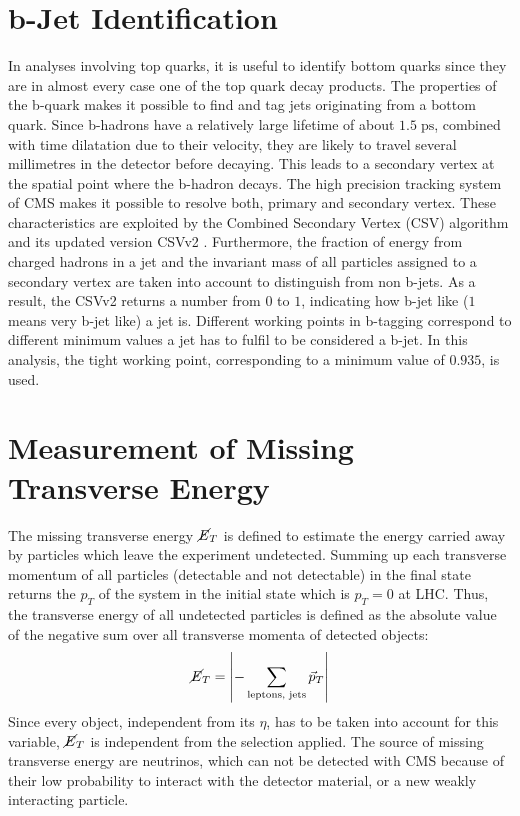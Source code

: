 \section{b-Jet Identification}
\label{sec:btag}
	In analyses involving top quarks, it is useful to identify bottom quarks since they are in almost every case one of the top quark decay products. The properties of the b-quark makes it possible to find and tag jets originating from a bottom quark. Since b-hadrons have a relatively large lifetime of about $1.5\;\text{ps}$, combined with time dilatation due to their velocity, they are likely to travel several millimetres in the detector before decaying. This leads to a secondary vertex at the spatial point where the b-hadron decays. The high precision tracking system of CMS makes it possible to resolve both, primary and secondary vertex. These characteristics are exploited by the Combined Secondary Vertex (CSV) algorithm \cite{csv} and its updated version CSVv2 \cite{btag}. Furthermore, the fraction of energy from charged hadrons in a jet and the invariant mass of all particles assigned to a secondary vertex are taken into account to distinguish from non b-jets. As a result, the CSVv2 returns a number from $0$ to $1$, indicating how b-jet like ($1$ means very b-jet like) a jet is. Different working points \cite{btagperf} in b-tagging correspond to different minimum values a jet has to fulfil to be considered a b-jet. In this analysis, the tight working point, corresponding to a minimum value of $0.935$, is used. 
	
\section{Measurement of Missing Transverse Energy}
	The missing transverse energy $\cancel{E}_T$ is defined to estimate the energy carried away by particles which leave the experiment undetected. Summing up each transverse momentum of all particles (detectable and not detectable) in the final state returns the $p_T$ of the system in the initial state which is $p_T = 0$ at LHC. Thus, the transverse energy of all undetected particles is defined as the absolute value of the negative sum over all transverse momenta of detected objects:
	\begin{equation}
		\cancel{E}_T = \left| - \sum_{\textrm{leptons, jets}}^{} \vec{p}_T \right|
		\label{eq:MET}
	\end{equation}	
	Since every object, independent from its $\eta$, has to be taken into account for this variable, $\cancel{E}_T$ is independent from the selection applied. The source of missing transverse energy are neutrinos, which can not be detected with CMS because of their low probability to interact with the detector material, or a new weakly interacting particle. 

